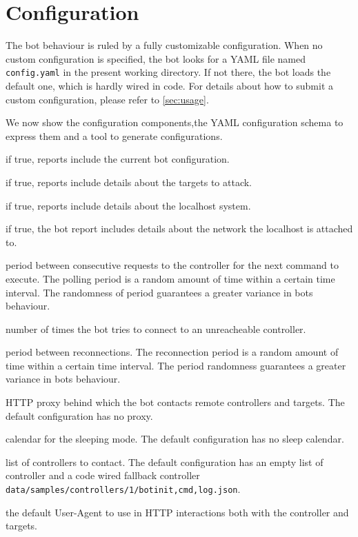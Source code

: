 \section{Configuration}
\label{sec:configuration}

The bot behaviour is ruled by a fully customizable configuration. When no custom configuration is specified, the bot looks for a YAML file named \texttt{config.yaml} in the present working directory. If not there, the bot loads the default one, which is hardly wired in code. For details about how to submit a custom configuration, please refer to \ref{sec:usage}.

We now show the configuration components,the YAML configuration schema to express them and a tool to generate configurations.

\begin{description}
  \setlength\itemsep{1em}

  \item[cnfInfo] if true, reports include the current bot configuration.

  \item[tgtInfo] if true, reports include details about the targets to attack.

  \item[sysInfo] if true, reports include details about the localhost system.

  \item[netInfo] if true, the bot report includes details about the network the localhost is attached to.

  \item[polling] period between consecutive requests to the controller for the next command to execute. The polling period is a random amount of time within a certain time interval. The randomness of period guarantees a greater variance in bots behaviour.

  \item[reconnections] number of times the bot tries to connect to an unreacheable controller.

  \item[reconnectionWait] period between reconnections. The reconnection period is a random amount of time within a certain time interval. The period randomness guarantees a greater variance in bots behaviour.

  \item[proxy] HTTP proxy behind which the bot contacts remote controllers and targets. The default configuration has no proxy.

  \item[sleep] calendar for the sleeping mode. The default configuration has no sleep calendar.

  \item[controllers] list of controllers to contact. The default configuration has an empty list of controller and a code wired fallback controller \texttt{data/samples/controllers/1/bot{init,cmd,log}.json}.

  \item[userAgent] the default User-Agent to use in HTTP interactions both with the controller and targets.
\end{description}

